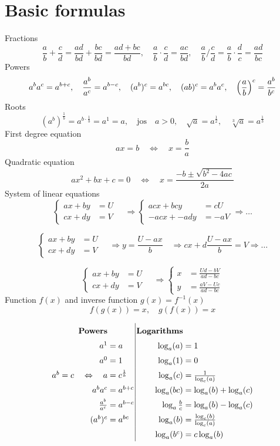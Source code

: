\documentclass[12pt]{article}
\begin{document}
\newpage
\section*{Basic formulas}

Fractions
$$
\frac{a}{b}+\frac{c}{d}=\frac{ad}{bd}+\frac{bc}{bd}
=\frac{ad+bc}{bd},\quad 
\frac{a}{b}\cdot\frac{c}{d}=\frac{ac}{bd},\quad
\frac{a}{b}\bigg/\frac{c}{d}=\frac{a}{b}\cdot\frac{d}{c}=\frac{ad}{bc}
$$
Powers
$$
a^ba^c=a^{b+c},\quad 
\frac{a^b}{a^c}=a^{b-c},\quad 
(a^b)^c=a^{bc},\quad 
(ab)^c=a^ba^c,\quad 
\left(\frac{a}{b}\right)^c=\frac{a^b}{b^c}
$$
Roots
$$
(a^b)^{\frac{1}{b}}=a^{b\cdot \frac{1}{b}}=a^1=a,\quad\textrm{jos}\quad a>0,\quad 
\sqrt{a}=a^{\frac{1}{2}},\quad \sqrt[3]{a}=a^{\frac{1}{3}}
$$
First degree equation
$$
ax=b\quad\Leftrightarrow\quad x=\frac{b}{a}
$$
Quadratic equation
$$
ax^2+bx+c=0\quad\Leftrightarrow\quad x=\frac{-b\pm\sqrt{b^2-4ac}}{2a}
$$
System of linear equations
$$
\begin{cases}
ax+by&=U\\
cx+dy&=V
\end{cases}\quad\Rightarrow
\begin{cases}
acx+bcy&=cU\\
-acx+-ady&=-aV
\end{cases}\Rightarrow\ldots
$$

$$
\begin{cases}
ax+by&=U\\
cx+dy&=V
\end{cases}\quad\Rightarrow
y=\frac{U-ax}{b}\quad\Rightarrow
cx+d\frac{U-ax}{b}=V\Rightarrow\ldots
$$

$$
\begin{cases}
ax+by&=U\\
cx+dy&=V
\end{cases}\quad\Rightarrow
\begin{cases}
x&=\frac{Ud-bV}{ad-bc}\\
y&=\frac{aV-Uc}{ad-bc}
\end{cases}
$$
Function $f(x)$ and inverse function $g(x)=f^{-1}(x)$
$$
f(g(x))=x,\quad
g(f(x))=x
$$

$$\arraycolsep=1.4pt\def\arraystretch{1.5}
\begin{array}{rl|rl}
\textbf{Powers} && \textbf{Logarithms}\\
a^1 &=a & \log_a(a)&=1\\
a^0 &=1 & \log_a(1)&=0\\
a^b=c\quad\Leftrightarrow\quad a&=c^{\frac{1}{b}} & \log_a(c) &=\frac{1}{\log_c(a)}\\
a^ba^c &= a^{b+c} & \log_a(bc)&=\log_a(b)+\log_a(c)\\
\frac{a^b}{a^c}&=a^{b-c} & \log_a\frac{b}{c}&=\log_a(b)-\log_a(c)\\
(a^b)^c&=a^{bc} & \log_a(b)&=\frac{\log_c(b)}{\log_c(a)}\\
&& \log_a(b^c)&=c\log_a(b)\\
\end{array}
$$
\end{document}
